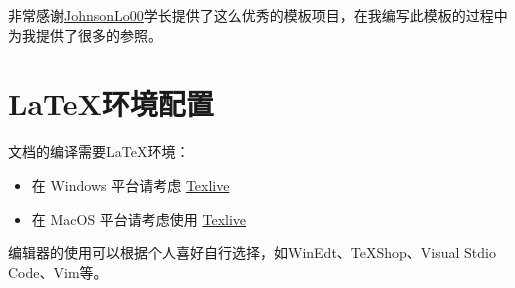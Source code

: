 非常感谢\href{https://github.com/JohnsonLo00}{JohnsonLo00}学长提供了这么优秀的模板项目，在我编写此模板的过程中为我提供了很多的参照。

\section{\LaTeX 环境配置}

文档的编译需要\LaTeX 环境：

\begin{itemize}
  \item 在 Windows 平台请考虑 \href{https://mirrors.tuna.tsinghua.edu.cn/CTAN/systems/texlive/Images/}{Texlive}
  \item 在 MacOS 平台请考虑使用 \href{https://mirrors.tuna.tsinghua.edu.cn/CTAN/systems/texlive/Images/}{Texlive}
\end{itemize}

编辑器的使用可以根据个人喜好自行选择，如WinEdt、TeXShop、Visual Stdio Code、Vim等。
